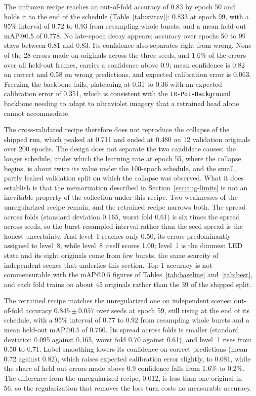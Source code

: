 ﻿\documentclass[journal]{IEEEtran}
\begin{document}
The unfrozen recipe reaches an out-of-fold accuracy of 0.83 by epoch 50 and holds it to the end of the schedule (Table~\ref{tab:stircv}): 0.833 at epoch 99, with a 95\% interval of 0.72 to 0.93 from resampling whole bursts, and a mean held-out $\text{mAP@0.5}$ of 0.778. No late-epoch decay appears; accuracy over epochs 50 to 99 stays between 0.81 and 0.83. Its confidence also separates right from wrong. None of the 28 errors made on originals across the three seeds, and 1.6\% of the errors over all held-out frames, carries a confidence above 0.9; mean confidence is 0.82 on correct and 0.58 on wrong predictions, and expected calibration error is 0.063. Freezing the backbone fails, plateauing at 0.31 to 0.36 with an expected calibration error of 0.351, which is consistent with the \texttt{IR-Pot-Background} backbone needing to adapt to ultraviolet imagery that a retrained head alone cannot accommodate.

The cross-validated recipe therefore does not reproduce the collapse of the shipped run, which peaked at 0.711 and ended at 0.480 on 12 validation originals over 200 epochs. The design does not separate the two candidate causes: the longer schedule, under which the learning rate at epoch 55, where the collapse begins, is about twice its value under the 100-epoch schedule, and the small, partly leaked validation split on which the collapse was observed. What it does establish is that the memorization described in Section~\ref{sec:aug-limits} is not an inevitable property of the collection under this recipe. Two weaknesses of the unregularized recipe remain, and the retrained recipe narrows both. The spread across folds (standard deviation 0.165, worst fold 0.61) is six times the spread across seeds, so the burst-resampled interval rather than the seed spread is the honest uncertainty. And level~1 reaches only 0.50, its errors predominantly assigned to level~8, while level~8 itself scores 1.00; level~1 is the dimmest LED state and its eight originals come from few bursts, the same scarcity of independent scenes that underlies this section. Top-1 accuracy is not commensurable with the $\text{mAP@0.5}$ figures of Tables~\ref{tab:baseline} and~\ref{tab:best}, and each fold trains on about 45 originals rather than the 39 of the shipped split.

The retrained recipe matches the unregularized one on independent scenes: out-of-fold accuracy $0.845 \pm 0.057$ over seeds at epoch 59, still rising at the end of its schedule, with a 95\% interval of 0.77 to 0.92 from resampling whole bursts and a mean held-out $\text{mAP@0.5}$ of 0.760. Its spread across folds is smaller (standard deviation 0.095 against 0.165, worst fold 0.70 against 0.61), and level~1 rises from 0.50 to 0.71. Label smoothing lowers its confidence on correct predictions (mean 0.72 against 0.82), which raises expected calibration error slightly, to 0.081, while the share of held-out errors made above 0.9 confidence falls from 1.6\% to 0.2\%. The difference from the unregularized recipe, 0.012, is less than one original in 56, so the regularization that removes the loss turn costs no measurable accuracy.
\end{document}
